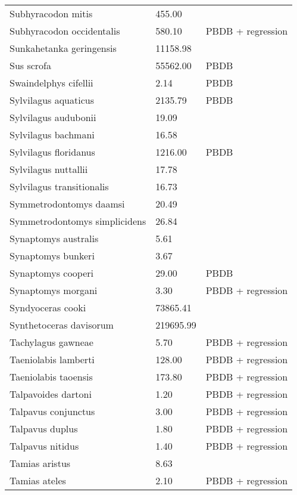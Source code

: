 \begin{longtable}{p{} p{} p{}}
    Subhyracodon mitis & 455.00 & \cite{Scott1940} \\ 
    Subhyracodon occidentalis & 580.10 & PBDB + regression \\ 
    Sunkahetanka geringensis & 11158.98 & \cite{Tomiya2013} \\ 
    Sus scrofa & 55562.00 & PBDB \\ 
    Swaindelphys cifellii & 2.14 & PBDB \\ 
    Sylvilagus aquaticus & 2135.79 & PBDB \\ 
    Sylvilagus audubonii & 19.09 & \cite{Smith2004} \\ 
    Sylvilagus bachmani & 16.58 & \cite{Smith2004} \\ 
    Sylvilagus floridanus & 1216.00 & PBDB \\ 
    Sylvilagus nuttallii & 17.78 & \cite{Smith2004} \\ 
    Sylvilagus transitionalis & 16.73 & \cite{Smith2004} \\ 
    Symmetrodontomys daamsi & 20.49 & \cite{Tomiya2013} \\ 
    Symmetrodontomys simplicidens & 26.84 & \cite{Tomiya2013} \\ 
    Synaptomys australis & 5.61 & \cite{Smith2004} \\ 
    Synaptomys bunkeri & 3.67 & \cite{Smith2004} \\ 
    Synaptomys cooperi & 29.00 & PBDB \\ 
    Synaptomys morgani & 3.30 & PBDB + regression \\ 
    Syndyoceras cooki & 73865.41 & \cite{Tomiya2013} \\ 
    Synthetoceras davisorum & 219695.99 & \cite{Tomiya2013} \\ 
    Tachylagus gawneae & 5.70 & PBDB + regression \\ 
    Taeniolabis lamberti & 128.00 & PBDB + regression \\ 
    Taeniolabis taoensis & 173.80 & PBDB + regression \\ 
    Talpavoides dartoni & 1.20 & PBDB + regression \\ 
    Talpavus conjunctus & 3.00 & PBDB + regression \\ 
    Talpavus duplus & 1.80 & PBDB + regression \\ 
    Talpavus nitidus & 1.40 & PBDB + regression \\ 
    Tamias aristus & 8.63 & \cite{Smith2004} \\ 
    Tamias ateles & 2.10 & PBDB + regression \\ 

\end{longtable}
